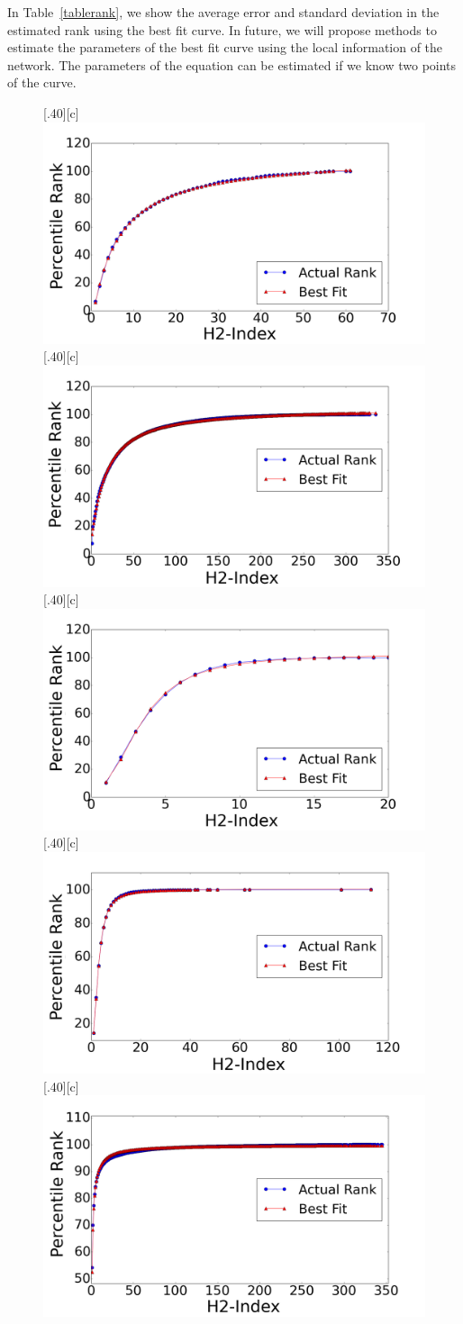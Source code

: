 \documentclass[12pt,3p]{article}
\begin{document}
In Table~\ref{tablerank}, we show the average error and standard deviation in the estimated rank using the best fit curve. In future, we will propose methods to estimate the parameters of the best fit curve using the local information of the network. The parameters of the equation can be estimated if we know two points of the curve.


\begin{figure}[htp]
  \centering
  [.40\linewidth][c]{%
    \includegraphics[width=.40\linewidth]{images/astro_k.png}}\quad
  [.40\linewidth][c]{%
    \includegraphics[width=.40\linewidth]{images/buzznet_k.png}}
   [.40\linewidth][c]{%
    \includegraphics[width=.40\linewidth]{images/condmat_k.png}}\quad
  [.40\linewidth][c]{%
    \includegraphics[width=.40\linewidth]{images/dblp_k.png}}
    [.40\linewidth][c]{%
    \includegraphics[width=.40\linewidth]{images/digg_k.png}}\quad

\end{figure}
\end{document}
